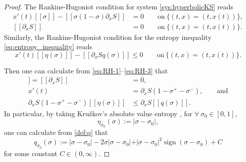 \documentclass[12pt]{article}
\theoremstyle{definition}
\theoremstyle{remark}
\DeclareMathOperator{\sign}{\mathrm{sign}}
\newcommand{\dx}{\partial_x}
\numberwithin{equation}{section}
\begin{document}
\begin{proof}



\smallskip 

The Rankine-Hugoniot condition for system \eqref{sys:hyperbolicKS} reads
\begin{align}
    \label{eq:RH-1}
    x'(t) [[\sigma]] - [[\sigma (1-\sigma) \partial_x S]] & = 0 \qquad \text{on} ~ \lbrace (t,x) = (t, x(t)) \rbrace, \\
    \label{eq:RH-2}
    [[\dx S]] & = 0 \qquad \text{on} ~ \lbrace (t,x) = (t, x(t)) \rbrace.
\end{align}
Similarly, the Rankine-Hugoniot condition for the entropy inequality \eqref{eq:entropy_inequality} reads
\begin{equation}
    \label{eq:RH-3}
    x'(t)[[\eta(\sigma)]]  - [[ \dx S q(\sigma)]] \leq  0 \qquad \text{on} ~ \lbrace (t,x) = (t,x(t)) \rbrace. 
\end{equation}

\smallskip

Then one can calculate from \eqref{eq:RH-1}--\eqref{eq:RH-3} that
\begin{align}
    [[S]] = [[\dx S]] & = 0, \label{eq:jump-1-0} \\
    x'(t) & = \dx S(1- \sigma^+ - \sigma^-), \label{eq:jump-2-0} \qquad \text{and} \\
    \dx S (1-\sigma^+ - \sigma^- )[[\eta(\sigma)]] & \leq  \dx S [[q(\sigma)]]. \label{eq:jump-3-0}
\end{align}
In particular, by taking Kru\v{z}kov's absolute value entropy \cite{kruzkovFIRSTORDERQUASILINEAR1970,bouchutKruzkovEstimatesScalar1998}, for $ \forall\ \sigma_0 \in [0,1] $,
\begin{equation}
\label{entropy-abs}
\eta_{\sigma_0}(\sigma) := \vert \sigma-\sigma_0 \vert,
\end{equation}
one can calculate from \eqref{def:q} that 
\begin{equation}
    \label{entropy-flux-abs}
    q_{\sigma_0}(\sigma):= \vert \sigma - \sigma_0 \vert - 2 \sigma \vert \sigma - \sigma_0\vert + \vert \sigma - \sigma_0\vert^2 \sign(\sigma-\sigma_0) + C
\end{equation}
for some constant $ C \in (0,\infty) $. 

\smallskip 


\end{proof}
\end{document}
